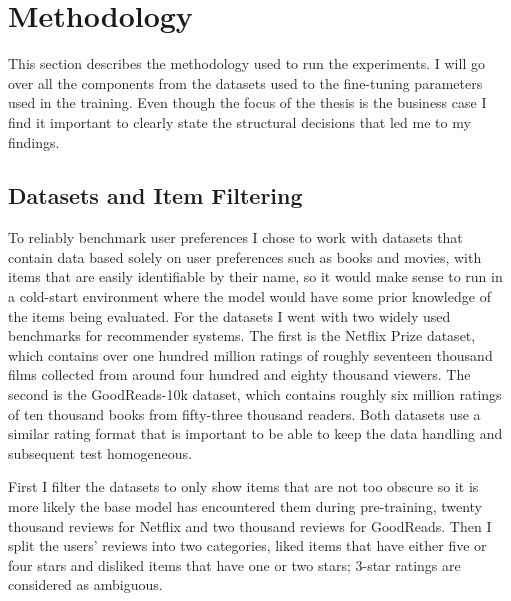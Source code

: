 
\section{Methodology}
\label{sec:methodology}

This section describes the methodology used to run the experiments. I will go over all the components from the datasets used to the fine-tuning parameters used in the training. Even though the focus of the thesis is the business case I find it important to clearly state the structural decisions that led me to my findings.

\subsection{Datasets and Item Filtering}
\label{sec:data}

To reliably benchmark user preferences I chose to work with datasets that contain data based solely on user preferences such as books and movies, with items that are easily identifiable by their name, so it would make sense to run in a cold-start environment where the model would have some prior knowledge of the items being evaluated. For the datasets I went with two widely used benchmarks for recommender systems. The first is the Netflix Prize dataset, which contains over one hundred million ratings of roughly seventeen thousand films collected from around four hundred and eighty thousand viewers. The second is the GoodReads-10k dataset, which contains roughly six million ratings of ten thousand books from fifty-three thousand readers. Both datasets use a similar rating format that is important to be able to keep the data handling and subsequent test homogeneous.

First I filter the datasets to only show items that are not too obscure so it is more likely the base model has encountered them during pre-training, twenty thousand reviews for Netflix and two thousand reviews for GoodReads. Then I split the users' reviews into two categories, liked items that have either five or four stars and disliked items that have one or two stars; 3-star ratings are considered as ambiguous.


